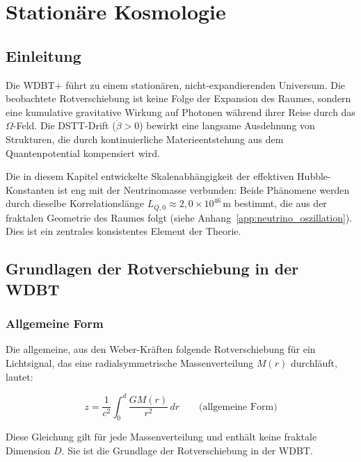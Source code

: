 
\chapter{Stationäre Kosmologie}
\label{ch:kosmologie}

\section{Einleitung}
\label{sec:kosmo_einleitung}

Die WDBT+ führt zu einem stationären, nicht-expandierenden Universum. Die beobachtete Rotverschiebung ist keine Folge der Expansion des Raumes, sondern eine kumulative gravitative Wirkung auf Photonen während ihrer Reise durch das \( \Omega \)-Feld. Die DSTT-Drift (\( \dot{\beta} > 0 \)) bewirkt eine langsame Ausdehnung von Strukturen, die durch kontinuierliche Materieentstehung aus dem Quantenpotential kompensiert wird.

Die in diesem Kapitel entwickelte Skalenabhängigkeit der effektiven Hubble-Konstanten ist eng mit der Neutrinomasse verbunden: Beide Phänomene werden durch dieselbe Korrelationslänge \( L_{Q,0} \approx 2{,}0 \times 10^{46} \, \text{m} \) bestimmt, die aus der fraktalen Geometrie des Raumes folgt (siehe Anhang~\ref{app:neutrino_oszillation}). Dies ist ein zentrales konsistentes Element der Theorie.

\section{Grundlagen der Rotverschiebung in der WDBT}
\label{sec:kosmo_rotverschiebung}

\subsection{Allgemeine Form}
\label{sub:kosmo_rot_allgemein}

Die allgemeine, aus den Weber-Kräften folgende Rotverschiebung für ein Lichtsignal, das eine radialsymmetrische Massenverteilung \( M(r) \) durchläuft, lautet:

\[
z = \frac{1}{c^2} \int_0^d \frac{G M(r)}{r^2} \, dr \qquad \text{(allgemeine Form)}
\]

Diese Gleichung gilt für jede Massenverteilung und enthält keine fraktale Dimension \( D \). Sie ist die Grundlage der Rotverschiebung in der WDBT.

